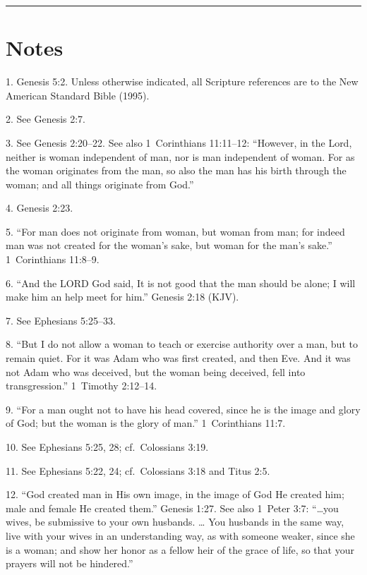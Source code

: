 \documentclass[
]{book}
\begin{document}
\begin{center}\rule{0.5\linewidth}{0.5pt}\end{center}

\hypertarget{notes}{%
\section*{Notes}\label{notes}}

1. Genesis 5:2. Unless otherwise indicated, all Scripture references are to the New American Standard Bible (1995).

2. See Genesis 2:7.

3. See Genesis 2:20--22. See also 1~Corinthians 11:11--12: ``However, in the Lord, neither is woman independent of man, nor is man independent of woman. For as the woman originates from the man, so also the man has his birth through the woman; and all things originate from God.''

4. Genesis 2:23.

5. ``For man does not originate from woman, but woman from man; for indeed man was not created for the woman's sake, but woman for the man's sake.'' 1~Corinthians 11:8--9.

6. ``And the LORD God said, It is not good that the man should be alone; I will make him an help meet for him.'' Genesis 2:18 (KJV).

7. See Ephesians 5:25--33.

8. ``But I do not allow a woman to teach or exercise authority over a man, but to remain quiet. For it was Adam who was first created, and then Eve. And it was not Adam who was deceived, but the woman being deceived, fell into transgression.'' 1~Timothy 2:12--14.

9. ``For a man ought not to have his head covered, since he is the image and glory of God; but the woman is the glory of man.'' 1~Corinthians 11:7.

10. See Ephesians 5:25, 28; cf.~Colossians 3:19.

11. See Ephesians 5:22, 24; cf.~Colossians 3:18 and Titus 2:5.

12. ``God created man in His own image, in the image of God He created him; male and female He created them.'' Genesis 1:27. See also 1~Peter 3:7: ``\ldots you wives, be submissive to your own husbands. \ldots{} You husbands in the same way, live with your wives in an understanding way, as with someone weaker, since she is a woman; and show her honor as a fellow heir of the grace of life, so that your prayers will not be hindered.''
\end{document}
